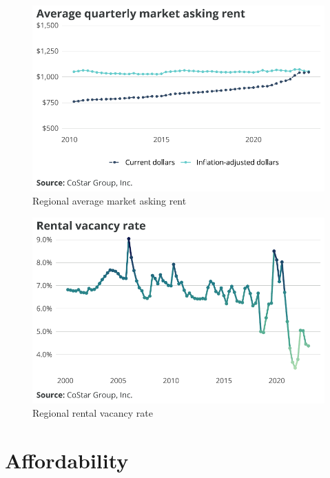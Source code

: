 \documentclass[
  letterpaper,
  DIV=11,
  numbers=noendperiod]{scrreprt}
\begin{document}
\begin{figure}[H]

{\centering \includegraphics{./part-3-1_files/figure-pdf/fig-rent-1.pdf}

}

\caption{\label{fig-rent}Regional average market asking rent}

\end{figure}

\begin{figure}[H]

{\centering \includegraphics{./part-3-1_files/figure-pdf/fig-vacancy-1.pdf}

}

\caption{\label{fig-vacancy}Regional rental vacancy rate}

\end{figure}

\hypertarget{affordability}{%
\section{Affordability}\label{affordability}}
\end{document}
